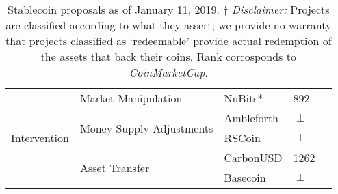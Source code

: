 \begin{table}[t]
\begin{tabular}{|l|l|l|l|l|}
 \multirow{5}{*}{Intervention}                                                           
						& \multirow{1}{*}{Market Manipulation} 						& NuBits* 			& 892 \\ \cline{2-4}
						& \multirow{2}{*}{Money Supply Adjustments}  				& Ambleforth		& $\perp$  \\ \cline{3-4}
						&   													& RSCoin 			& $\perp$  \\ \cline{2-4}
						& \multirow{2}{*}{Asset Transfer}  							& CarbonUSD		& 1262 \\ \cline{3-4}
						&													& Basecoin 		& $\perp$ \\ \cline{1-4}
\hline
\end{tabular}
\caption{Stablecoin proposals as of January 11, 2019. $\dagger$ \textit{Disclaimer:} Projects are classified according to what they assert; \eg we provide no warranty that projects classified as `redeemable' provide actual redemption of the assets that back their coins. Rank corrosponds to \textit{CoinMarketCap}.\label{tab:stablecoins}}
\end{table}
